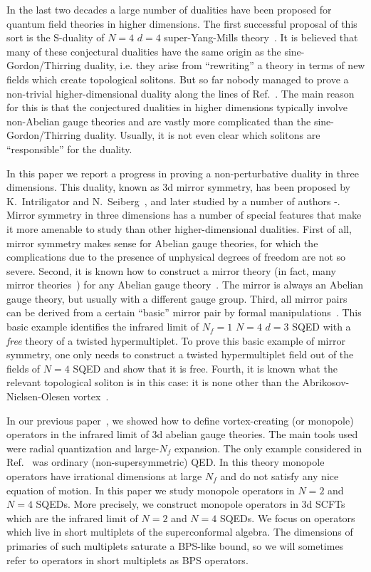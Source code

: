 \documentclass[a4paper,12pt, amsfonts, amssymb]{article}
\begin{document}
In the last two decades a large number of dualities have been proposed for
quantum field theories in higher dimensions. The first successful
proposal of this sort is the S-duality of $N=4$ $d=4$ super-Yang-Mills
theory~\cite{MO,WO,Osborn}. It is believed that many of these conjectural dualities have the same origin as the sine-Gordon/Thirring duality,
i.e. they arise from ``rewriting'' a theory in terms of new fields
which create topological solitons. But so far nobody managed to
prove a non-trivial higher-dimensional duality along the lines of
Ref.~\cite{Mandelstam}. The main reason for this is that the conjectured
dualities in higher dimensions typically involve non-Abelian
gauge theories and are vastly more complicated than the sine-Gordon/Thirring duality. Usually, it is not even clear which solitons
are ``responsible'' for the duality.

In this paper we report a progress in proving a non-perturbative duality
in three dimensions. This duality, known as 3d mirror symmetry,
has been proposed by K.~Intriligator and N.~Seiberg~\cite{IS}, and
later studied by a number of authors \cite{deBHOO}-\cite{GT}.
Mirror symmetry in three dimensions has a number of special features
that make it more amenable to study than other higher-dimensional
dualities. First of all, mirror symmetry makes sense for Abelian gauge
theories, for which the complications due to the presence of unphysical 
degrees of freedom are not so severe. Second, it is known how to
construct a mirror theory (in fact, many mirror theories~\cite{KS})
for any Abelian gauge theory~\cite{deBHOOY,KS}. The mirror is always an 
Abelian gauge theory, but usually with a different gauge group.
Third, all mirror pairs can be derived from
a certain ``basic'' mirror pair by formal manipulations~\cite{KS}.
This basic example identifies the infrared limit of $N_f=1$ $N=4$ $d=3$ 
SQED with a {\it free} theory of a twisted hypermultiplet. To prove
this basic example of mirror symmetry, one only needs to construct a 
twisted hypermultiplet field out of the fields of $N=4$ SQED and show 
that it is free. Fourth, it is known what the relevant topological soliton 
is in this case: it is none other than the Abrikosov-Nielsen-Olesen 
vortex~\cite{five}.

In our previous paper~\cite{BKWone}, we showed how to define
vortex-creating (or monopole) operators in the infrared limit
of 3d abelian gauge theories. The main tools used were radial 
quantization and large-$N_f$ expansion. 
The only example considered in Ref.~\cite{BKWone} was ordinary
(non-supersymmetric) QED.
In this theory monopole operators have irrational dimensions
at large $N_f$ and do not satisfy any nice equation of motion. 
In this paper we study monopole operators in $N=2$ and $N=4$ SQEDs.
More precisely, we construct monopole operators in 3d SCFTs which
are the infrared limit of $N=2$ and $N=4$ SQEDs. We focus on
operators which live in short multiplets of the superconformal algebra.
The dimensions of primaries of such multiplets saturate a BPS-like
bound, so we will sometimes refer to operators in short multiplets
as BPS operators.
\end{document}
